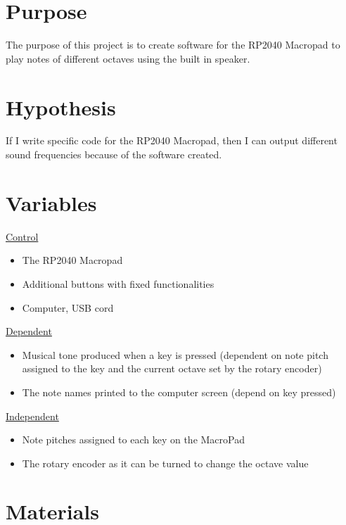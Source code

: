 \documentclass{article}
\begin{document}
\section{Purpose}

The purpose of this project is to create software for the RP2040 Macropad to play notes of different octaves using the built in speaker. 

\section{Hypothesis}

If I write specific code for the RP2040 Macropad, then I can output different sound frequencies because of the software created.

\section{Variables}

\underline{Control}
\begin{itemize}
    \item The RP2040 Macropad
    \item Additional buttons with fixed functionalities
    \item Computer, USB cord
\end{itemize}
\underline{Dependent}
\begin{itemize}
    \item Musical tone produced when a key is pressed (dependent on note pitch assigned to the key and the current octave set by the rotary encoder)
    \item The note names printed to the computer screen (depend on key pressed)
\end{itemize}
\underline{Independent}
\begin{itemize}
    \item Note pitches assigned to each key on the MacroPad
    \item The rotary encoder as it can be turned to change the octave value
\end{itemize}

\section{Materials}
\end{document}

